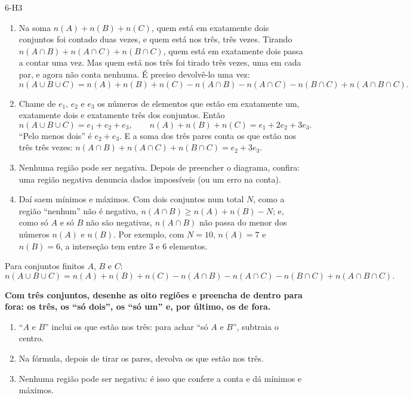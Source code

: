 \begin{construcao}{6-H3}
\begin{enumerate}[label=(\arabic*)]
  \item Na soma $n(A)+n(B)+n(C)$, quem está em exatamente dois conjuntos foi contado duas vezes, e quem está nos três, três vezes. Tirando $n(A\cap B)+n(A\cap C)+n(B\cap C)$, quem está em exatamente dois passa a contar uma vez. Mas quem está nos três foi tirado três vezes, uma em cada par, e agora não conta nenhuma. É preciso devolvê-lo uma vez:
\[
n(A\cup B\cup C)=n(A)+n(B)+n(C)-n(A\cap B)-n(A\cap C)-n(B\cap C)+n(A\cap B\cap C).
\]
  \item Chame de $e_1$, $e_2$ e $e_3$ os números de elementos que estão em exatamente um, exatamente dois e exatamente três dos conjuntos. Então
\[
n(A\cup B\cup C)=e_1+e_2+e_3,\qquad n(A)+n(B)+n(C)=e_1+2e_2+3e_3.
\]
\enquote{Pelo menos dois} é $e_2+e_3$. E a soma dos três pares conta os que estão nos três três vezes: $n(A\cap B)+n(A\cap C)+n(B\cap C)=e_2+3e_3$.
  \item Nenhuma região pode ser negativa. Depois de preencher o diagrama, confira: uma região negativa denuncia dados impossíveis (ou um erro na conta).
  \item Daí saem mínimos e máximos. Com dois conjuntos num total $N$, como a região \enquote{nenhum} não é negativa, $n(A\cap B)\ge n(A)+n(B)-N$; e, como só $A$ e só $B$ não são negativas, $n(A\cap B)$ não passa do menor dos números $n(A)$ e $n(B)$. Por exemplo, com $N=10$, $n(A)=7$ e $n(B)=6$, a interseção tem entre 3 e 6 elementos.
\end{enumerate}
\end{construcao}

\begin{definicao}
Para conjuntos finitos $A$, $B$ e $C$:
\[
n(A\cup B\cup C)=n(A)+n(B)+n(C)-n(A\cap B)-n(A\cap C)-n(B\cap C)+n(A\cap B\cap C).
\]
\end{definicao}

\begin{paralembrar}\label{lembrar-u6}
\textbf{Com três conjuntos, desenhe as oito regiões e preencha de dentro para fora: os três, os \enquote{só dois}, os \enquote{só um} e, por último, os de fora.}
\begin{enumerate}[label=\arabic*.,leftmargin=1.4em,itemsep=1pt]
  \item \enquote{$A$ e $B$} inclui os que estão nos três: para achar \enquote{só $A$ e $B$}, subtraia o centro.
  \item Na fórmula, depois de tirar os pares, devolva os que estão nos três.
  \item Nenhuma região pode ser negativa: é isso que confere a conta e dá mínimos e máximos.
\end{enumerate}
\end{paralembrar}

